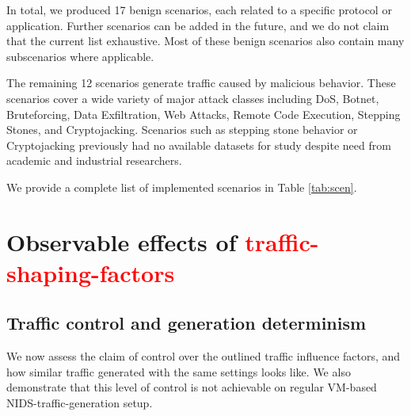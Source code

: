 \documentclass[runningheads]{llncs}
\begin{document}


In total, we produced 17 benign scenarios, each related to a specific protocol or application. Further scenarios can be added in the future, and we do not claim that the current list exhaustive. Most of these benign scenarios also contain many subscenarios where applicable.

The remaining 12 scenarios generate traffic caused by malicious behavior. These scenarios cover a wide variety of major attack classes including DoS, Botnet, Bruteforcing, Data Exfiltration, Web Attacks, Remote Code Execution, Stepping Stones, and Cryptojacking. 
Scenarios such as stepping stone behavior or Cryptojacking previously had no available datasets for study despite need from academic and industrial researchers.


We provide a complete list of implemented scenarios in Table \ref{tab:scen}.


\section{Observable effects of \textcolor{red}{traffic-shaping-factors}}\label{Sec:Experiments}




\subsection{Traffic control and generation determinism}
We now assess the claim of control over the outlined traffic influence factors, and how similar traffic generated with the same settings looks like. We also demonstrate that this level of control is not achievable on regular VM-based NIDS-traffic-generation setup.
\end{document}
